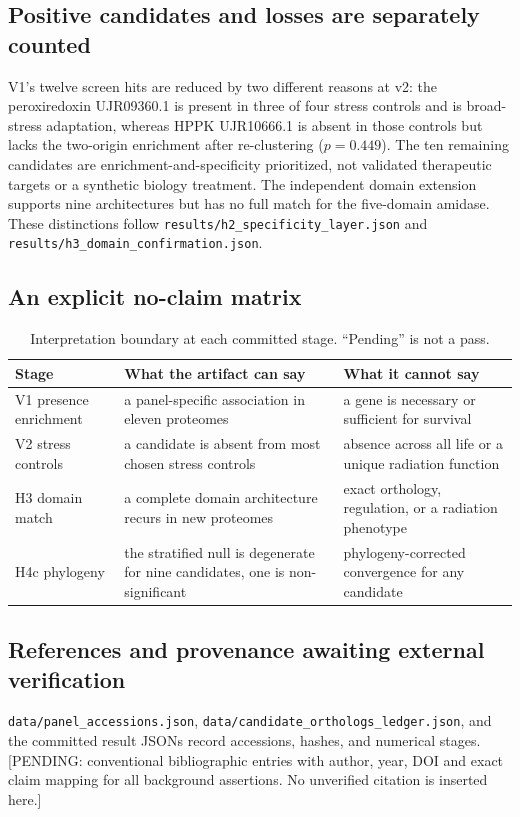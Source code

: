 \subsection{Positive candidates and losses are separately counted}
V1's twelve screen hits are reduced by two different reasons at v2: the peroxiredoxin UJR09360.1 is present in three of four stress controls and is broad-stress adaptation, whereas HPPK UJR10666.1 is absent in those controls but lacks the two-origin enrichment after re-clustering ($p=0.449$). The ten remaining candidates are enrichment-and-specificity prioritized, not validated therapeutic targets or a synthetic biology treatment. The independent domain extension supports nine architectures but has no full match for the five-domain amidase. These distinctions follow \texttt{results/h2\_specificity\_layer.json} and \texttt{results/h3\_domain\_confirmation.json}.
\subsection{An explicit no-claim matrix}
\begin{table}[!htbp]\centering\small\caption{Interpretation boundary at each committed stage. ``Pending'' is not a pass.}\begin{tabular}{p{3.4cm}p{4.1cm}p{5cm}}\hline Stage & What the artifact can say & What it cannot say \\\hline
V1 presence enrichment & a panel-specific association in eleven proteomes & a gene is necessary or sufficient for survival \\
V2 stress controls & a candidate is absent from most chosen stress controls & absence across all life or a unique radiation function \\
H3 domain match & a complete domain architecture recurs in new proteomes & exact orthology, regulation, or a radiation phenotype \\
H4c phylogeny & the stratified null is degenerate for nine candidates, one is non-significant & phylogeny-corrected convergence for any candidate \\\hline\end{tabular}\end{table}
\subsection{References and provenance awaiting external verification}
\texttt{data/panel\_accessions.json}, \texttt{data/candidate\_orthologs\_ledger.json}, and the committed result JSONs record accessions, hashes, and numerical stages. [PENDING: conventional bibliographic entries with author, year, DOI and exact claim mapping for all background assertions. No unverified citation is inserted here.]


